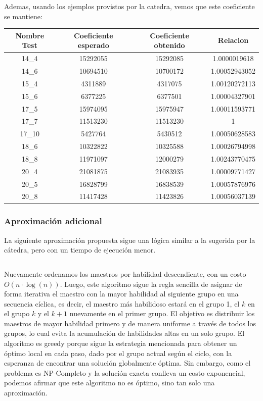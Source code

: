 \documentclass{article}
\begin{document}
Ademas, usando los ejemplos provistos por la catedra, vemos que este coeficiente se mantiene:

\begin{center}
\begin{tabular}{ |c|c|c|c| } 
 \hline
 Nombre Test & Coeficiente esperado & Coeficiente obtenido & Relacion \\ 
 \hline
  14\_4 & 15292055  & 15292085 & 1.0000019618 \\
 \hline
  14\_6 & 10694510  & 10700172 & 1.00052943052 \\
 \hline
  15\_4 & 4311889   & 4317075  & 1.00120272113 \\
 \hline
  15\_6 & 6377225   & 6377501  & 1.00004327901 \\
 \hline
  17\_5 & 15974095  & 15975947 & 1.00011593771 \\
 \hline
  17\_7 & 11513230  & 11513230 & 1 \\
 \hline
  17\_10 & 5427764  & 5430512  & 1.00050628583 \\
 \hline
  18\_6 & 10322822  & 10325588 & 1.00026794998 \\
 \hline
  18\_8 & 11971097  & 12000279 & 1.00243770475 \\
 \hline
  20\_4 & 21081875  & 21083935 & 1.00009771427 \\
 \hline
  20\_5 & 16828799  & 16838539 & 1.00057876976 \\
 \hline
  20\_8 & 11417428  & 11423826 & 1.00056037139 \\
  \hline
\end{tabular}
\end{center}


\subsubsection{Aproximación adicional}

La siguiente aproximación propuesta sigue una lógica similar a la sugerida por la cátedra, pero con un tiempo de ejecución menor.

\inputminted[linenos, firstline=3, lastline=33]{python}{codigo/aproximacion_adicional.py}

Nuevamente ordenamos los maestros por habilidad descendiente, con un costo $O(n\cdot \log(n))$. Luego, este algoritmo sigue la regla sencilla de asignar de forma iterativa el maestro con la mayor habilidad al siguiente grupo en una secuencia cíclica, es decir, el maestro más habilidoso estará en el grupo 1, el $k$ en el grupo $k$ y el $k+1$ nuevamente en el primer grupo. El objetivo es distribuir los maestros de mayor habilidad primero y de manera uniforme a través de todos los grupos, lo cual evita la acumulación de habilidades altas en un solo grupo. El algoritmo es greedy porque sigue la estrategia mencionada para obtener un óptimo local en cada paso, dado por el grupo actual según el ciclo, con la esperanza de encontrar una solución globalmente óptima. Sin embargo, como el problema es NP-Completo y la solución exacta conlleva un costo exponencial, podemos afirmar que este algoritmo no es óptimo, sino tan solo una aproximación. 
\end{document}

